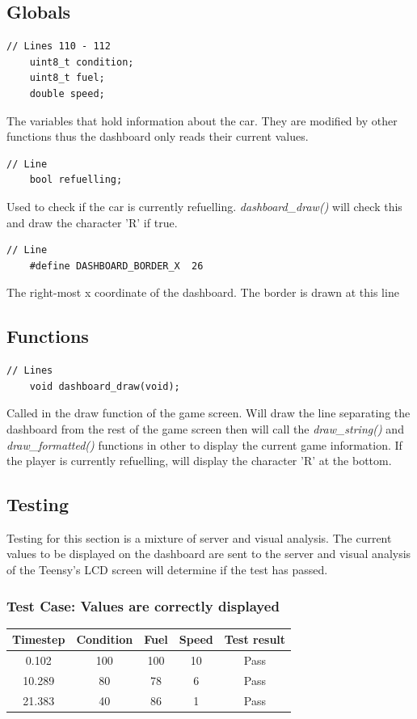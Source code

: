 \documentclass{article}
\begin{document}
\subsection*{Globals}
\begin{lstlisting}[style=CStyle]
	// Lines 110 - 112
	uint8_t condition;
	uint8_t fuel;
	double speed;
\end{lstlisting}
The variables that hold information about the car. They are modified by other functions thus the dashboard only reads their current values.
\begin{lstlisting}[style=CStyle]
	// Line
	bool refuelling;
\end{lstlisting}
Used to check if the car is currently refuelling. \emph{dashboard\_draw()} will check this and draw the character 'R' if true.
\begin{lstlisting}[style=CStyle]
	// Line
	#define DASHBOARD_BORDER_X  26
\end{lstlisting}
The right-most x coordinate of the dashboard. The border is drawn at this line

\subsection*{Functions}
\begin{lstlisting}[style=CStyle]
	// Lines 
	void dashboard_draw(void);
\end{lstlisting}
Called in the draw function of the game screen. Will draw the line separating the dashboard from the rest of the game screen then will call the \emph{draw\_string()} and \emph{draw\_formatted()} functions in other to display the current game information. If the player is currently refuelling, will display the character 'R' at the bottom. 

\subsection*{Testing}
Testing for this section is a mixture of server and visual analysis. The current values to be displayed on the dashboard are sent to the server and visual analysis of the Teensy's LCD screen will determine if the test has passed.
\subsubsection*{Test Case: Values are correctly displayed}
\begin{center}
\begin{tabular}{ c c c c c }
Timestep	& Condition	& Fuel		& Speed	& Test result	\\ \hline
0.102		& 100		& 100		& 10		& Pass	\\
10.289	& 80		& 78		& 6		& Pass	\\ 
21.383	& 40		& 86		& 1		& Pass	\\ \hline
\end{tabular}
\end{center}
\end{document}

